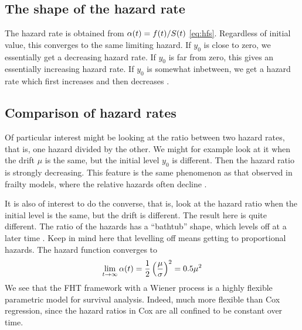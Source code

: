 \subsection{The shape of the hazard rate}
The hazard rate is obtained from $\alpha(t)=f(t)/S(t)$ \eqref{eq:hfs}. Regardless of initial value, this converges to the same limiting hazard. If $y_0$ is close to zero, we essentially get a decreasing hazard rate. If $y_0$ is far from zero, this gives an essentially increasing hazard rate. If $y_0$ is somewhat inbetween, we get a hazard rate which first increases and then decreases \citep{ABG}.


\subsection{Comparison of hazard rates}
Of particular interest might be looking at the ratio between two hazard rates, that is, one hazard divided by the other. We might for example look at it when the drift $\mu$ is the same, but the initial level $y_0$ is different. Then the hazard ratio is strongly decreasing. This feature is the same phenomenon as that observed in frailty models, where the relative hazards often decline \citep{ABG}.

It is also of interest to do the converse, that is, look at the hazard ratio when the initial level is the same, but the drift is different. The result here is quite different. The ratio of the hazards has a ``bathtub'' shape, which levels off at a later time \citep{ABG}. Keep in mind here that levelling off means getting to proportional hazards. The hazard function converges to
\begin{equation}
    \lim_{t\to\infty}\alpha(t)=\frac{1}{2}\left(\frac{\mu}{\sigma}\right)^2=0.5\mu^2
\end{equation}
We see that the FHT framework with a Wiener process is a highly flexible parametric model for survival analysis. Indeed, much more flexible than Cox regression, since the hazard ratios in Cox are all confined to be constant over time.

